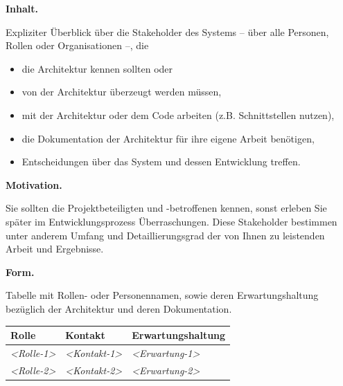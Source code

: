 \documentclass[]{article}
\begin{document}
\textbf{Inhalt.}

Expliziter Überblick über die Stakeholder des Systems -- über alle
Personen, Rollen oder Organisationen --, die

\begin{itemize}
\item
  die Architektur kennen sollten oder
\item
  von der Architektur überzeugt werden müssen,
\item
  mit der Architektur oder dem Code arbeiten (z.B. Schnittstellen
  nutzen),
\item
  die Dokumentation der Architektur für ihre eigene Arbeit benötigen,
\item
  Entscheidungen über das System und dessen Entwicklung treffen.
\end{itemize}

\textbf{Motivation.}

Sie sollten die Projektbeteiligten und -betroffenen kennen, sonst
erleben Sie später im Entwicklungsprozess Überraschungen. Diese
Stakeholder bestimmen unter anderem Umfang und Detaillierungsgrad der
von Ihnen zu leistenden Arbeit und Ergebnisse.

\textbf{Form.}

Tabelle mit Rollen- oder Personennamen, sowie deren Erwartungshaltung
bezüglich der Architektur und deren Dokumentation.

\begin{longtable}[]{@{}lll@{}}
\toprule
\begin{minipage}[b]{0.23\columnwidth}\raggedright
Rolle\strut
\end{minipage} & \begin{minipage}[b]{0.23\columnwidth}\raggedright
Kontakt\strut
\end{minipage} & \begin{minipage}[b]{0.46\columnwidth}\raggedright
Erwartungshaltung\strut
\end{minipage}\tabularnewline
\midrule
\endhead
\begin{minipage}[t]{0.23\columnwidth}\raggedright
\emph{\textless{}Rolle-1\textgreater{}}\strut
\end{minipage} & \begin{minipage}[t]{0.23\columnwidth}\raggedright
\emph{\textless{}Kontakt-1\textgreater{}}\strut
\end{minipage} & \begin{minipage}[t]{0.46\columnwidth}\raggedright
\emph{\textless{}Erwartung-1\textgreater{}}\strut
\end{minipage}\tabularnewline
\begin{minipage}[t]{0.23\columnwidth}\raggedright
\emph{\textless{}Rolle-2\textgreater{}}\strut
\end{minipage} & \begin{minipage}[t]{0.23\columnwidth}\raggedright
\emph{\textless{}Kontakt-2\textgreater{}}\strut
\end{minipage} & \begin{minipage}[t]{0.46\columnwidth}\raggedright
\emph{\textless{}Erwartung-2\textgreater{}}\strut
\end{minipage}\tabularnewline
\bottomrule
\end{longtable}
\end{document}

